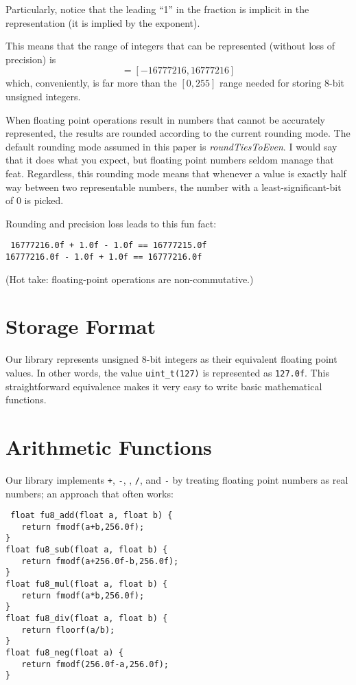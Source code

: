 \documentclass{acmsiggraph}
\theoremstyle{remark}
\theoremstyle{definition}
\begin{document}
Particularly, notice that the leading ``1'' in the fraction is implicit in the representation (it is implied by the exponent).

This means that the range of integers that can be represented (without loss of precision) is
\begin{displaymath}
[-2^{24},2^{24}] = [-16777216, 16777216]
\end{displaymath}
which, conveniently, is far more than the $[0,255]$ range needed for storing 8-bit unsigned integers.

When floating point operations result in numbers that cannot be accurately represented, the results are rounded according to the current rounding mode.
The default rounding mode assumed in this paper is {\em roundTiesToEven}.
I would say that it does what you expect, but floating point numbers seldom manage that feat.
Regardless, this rounding mode means that whenever a value is exactly half way between two representable numbers, the number with a least-significant-bit of 0 is picked.

Rounding and precision loss leads to this fun fact:
\begin{center} \tt
16777216.0f + 1.0f - 1.0f == 16777215.0f\\
16777216.0f - 1.0f + 1.0f == 16777216.0f
\end{center}
(Hot take: floating-point operations are non-commutative.)

\section{Storage Format}
Our library represents unsigned 8-bit integers as their equivalent floating point values.
In other words, the value {\tt uint\_t(127)} is represented as {\tt 127.0f}.
This straightforward equivalence makes it very easy to write basic mathematical functions.

\section{Arithmetic Functions}
Our library implements {\tt +}, {\tt -}, {\tt *}, {\tt /}, and {\tt -} by treating floating point numbers as real numbers; an approach that often works:

{\tt
float fu8\_add(float a, float b) \{ \\
$\phantom{XX}$return fmodf(a+b,256.0f); \\
\} \\
float fu8\_sub(float a, float b) \{ \\
$\phantom{XX}$return fmodf(a+256.0f-b,256.0f); \\
\} \\
float fu8\_mul(float a, float b) \{ \\
$\phantom{XX}$return fmodf(a*b,256.0f); \\
\} \\
float fu8\_div(float a, float b) \{ \\
$\phantom{XX}$return floorf(a/b); \\
\} \\
float fu8\_neg(float a) \{ \\
$\phantom{XX}$return fmodf(256.0f-a,256.0f); \\
\}
}
\end{document}

